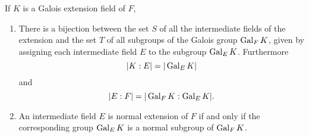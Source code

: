\begin{theorem}
    If $K$ is a Galois extension field of $F$, 
    \begin{enumerate}
        \item There is a bijection between the set $S$ of all the intermediate fields of the extension and 
            the set $T$ of all subgroups of the Galois group $\operatorname{Gal}_F K$, given by assigning each intermediate 
            field $E$ to the subgroup $\operatorname{Gal}_E K$. Furthermore
            \[
                |K:E| = |\operatorname{Gal}_E K|
            \]
            and 
            \[
                |E:F| = |\operatorname{Gal}_F K : \operatorname{Gal}_E K|.
            \]
        
        \item An intermediate field $E$ is normal extension of $F$ if and only if the 
            corresponding group $\operatorname{Gal}_E K$ is a normal subgroup of $\operatorname{Gal}_F K$.
    \end{enumerate}
\end{theorem}
